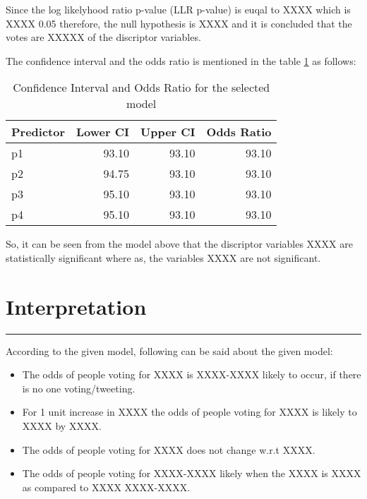 \documentclass[a4paper,12pt, notitlepage]{article}
\begin{document}
\par
Since the log likelyhood ratio p-value (LLR p-value) is euqal to XXXX which is XXXX 0.05 therefore, the null hypothesis is XXXX and it is concluded that the votes are XXXXX of the discriptor variables. %
\par
The confidence interval and the odds ratio is mentioned in the table \ref{table:5} as follows:

\begin{table}[!htbp]
\centering
\begin{tabular}{ |l|r|r|r| } 
\hline \rowcolor{Gray}
Predictor & Lower CI & Upper CI & Odds Ratio   \\
\hline
p1 & 93.10 & 93.10 & 93.10 \\ 
p2 & 94.75 & 93.10 & 93.10 \\ 
p3 & 95.10 & 93.10 & 93.10 \\ 
p4 & 95.10 & 93.10 & 93.10 \\ 
\hline
\end{tabular}
\caption{Confidence Interval and Odds Ratio for the selected model}
\label{table:5}
\end{table}

So, it can be seen from the model above that the discriptor variables XXXX are statistically significant where as, the variables XXXX are not significant.

\section{Interpretation}
\rule{\textwidth}{0.5pt}
\par
According to the given model, following can be said about the given model:

\begin{itemize}
  \item The odds of people voting for XXXX is XXXX-XXXX likely to occur, if there is no one voting/tweeting.
  \item For 1 unit increase in XXXX the odds of people voting for XXXX is likely to XXXX by XXXX.
  \item The odds of people voting for XXXX does not change w.r.t XXXX.
  \item The odds of people voting for XXXX-XXXX likely when the XXXX is XXXX as compared to XXXX XXXX-XXXX.
\end{itemize}
\end{document}
